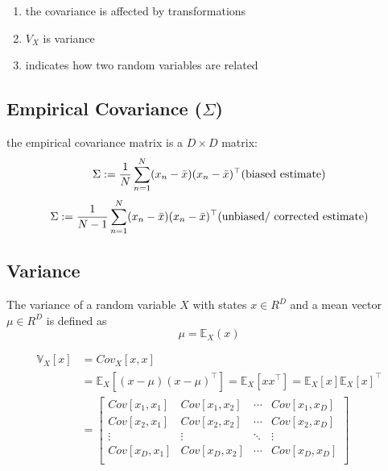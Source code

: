 \begin{enumerate}
\begin{enumerate}
    \end{enumerate}

    \item the covariance is affected by transformations
    
    \item $V_X$ is variance

    \item indicates how two random variables are related

\end{enumerate}

\subsection{Empirical Covariance ($\Sigma$) \cite{mfml-1}}\label{Multivariate Distributions: Empirical Covariance}

the empirical covariance matrix is a $D\times D$ matrix:
\[
    \Sigma
    := \dfrac{1}{N}
    \dsum_{n=1}^{N}
    (x_n - \bar{x})(x_n - \bar{x})^\top
    \hfill
    \text{(biased estimate)}
\]
\[
    \Sigma
    := \dfrac{1}{N-1}
    \dsum_{n=1}^{N}
    (x_n - \bar{x})(x_n - \bar{x})^\top
    \hfill
    \text{(unbiased/ corrected estimate)}
\]


\subsection{Variance \cite{mfml-1}}\label{Multivariate Distributions: Variance}

The variance of a random variable $X$ with states $x \in R^D$ and a mean vector $\mu \in R^D$ is defined as
\[
    \mu = \mathbb{E}_X(x)
\]

\begin{align*}
    \mathbb{V}_X[x] 
    &= Cov_X[x,x]\\
    &= \mathbb{E}_X[(x-\mu)(x-\mu)^\top]
    = \mathbb{E}_X[xx^\top]
    = \mathbb{E}_X[x]\mathbb{E}_X[x]^\top\\
    &= \begin{bmatrix}
        Cov[x_1,x_1] & Cov[x_1,x_2] & \cdots & Cov[x_1,x_D]\\
        Cov[x_2,x_1] & Cov[x_2,x_2] & \cdots & Cov[x_2,x_D]\\
        \vdots & \vdots & \ddots & \vdots \\
        Cov[x_D,x_1] & Cov[x_D,x_2] & \cdots & Cov[x_D,x_D]\\
    \end{bmatrix}
\end{align*}

